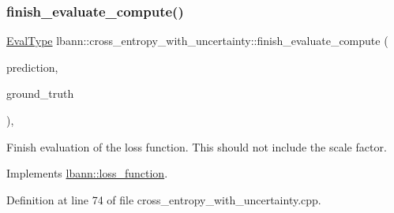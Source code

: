 \mbox{\label{classlbann_1_1cross__entropy__with__uncertainty_abb9b240766b395dab052e3225a0888f6}} 
\subsubsection{\texorpdfstring{finish\+\_\+evaluate\+\_\+compute()}{finish\_evaluate\_compute()}}
{\footnotesize\ttfamily \hyperlink{base_8hpp_a3266f5ac18504bbadea983c109566867}{Eval\+Type} lbann\+::cross\+\_\+entropy\+\_\+with\+\_\+uncertainty\+::finish\+\_\+evaluate\+\_\+compute (\begin{DoxyParamCaption}\item[{const \hyperlink{base_8hpp_a9a697a504ae84010e7439ffec862b470}{Abs\+Dist\+Mat} \&}]{prediction,  }\item[{const \hyperlink{base_8hpp_a9a697a504ae84010e7439ffec862b470}{Abs\+Dist\+Mat} \&}]{ground\+\_\+truth }\end{DoxyParamCaption})\hspace{0.3cm}{\ttfamily [override]}, {\ttfamily [virtual]}}

Finish evaluation of the loss function. This should not include the scale factor. 

Implements \hyperlink{classlbann_1_1loss__function_a3ea8553a4e9c75477d7d4fc533c4d4fd}{lbann\+::loss\+\_\+function}.



Definition at line 74 of file cross\+\_\+entropy\+\_\+with\+\_\+uncertainty.\+cpp.



